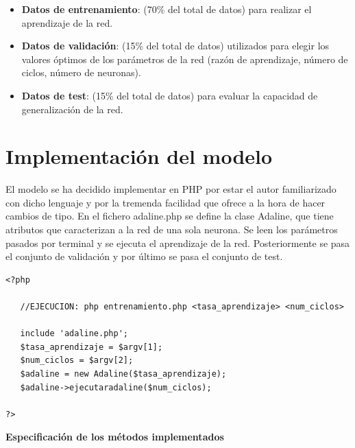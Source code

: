 \documentclass[11pt,spanish,listoffigures,listoftables]{workluis}
\begin{document}
\begin{itemize}
\item \textbf{Datos de entrenamiento}: (70\%  del  total  de  datos) para  realizar  el aprendizaje de la red. 
\item \textbf{Datos de validación}: (15\%  del  total  de  datos) utilizados para elegir los  valores  óptimos  de los parámetros  de  la  red  (razón  de aprendizaje, número de ciclos, número de neuronas).
\item \textbf{Datos de test}: (15\%  del  total  de  datos) para evaluar la capacidad de generalización de la red.
\end{itemize}

\section{Implementación del modelo}

\par El modelo se ha decidido implementar en PHP por estar el autor familiarizado con dicho lenguaje y por la tremenda facilidad que ofrece a la hora de hacer cambios de tipo. En el fichero adaline.php se define la clase Adaline, que tiene atributos que caracterizan a la red de una sola neurona. Se leen los parámetros pasados por terminal y se ejecuta el aprendizaje de la red. Posteriormente se pasa el conjunto de validación y por último se pasa el conjunto de test.

\begin{lstlisting}
<?php

   //EJECUCION: php entrenamiento.php <tasa_aprendizaje> <num_ciclos>

   include 'adaline.php';
   $tasa_aprendizaje = $argv[1];
   $num_ciclos = $argv[2];
   $adaline = new Adaline($tasa_aprendizaje);
   $adaline->ejecutaradaline($num_ciclos);

?>
\end{lstlisting}

\par \textbf{Especificación de los métodos implementados}
\end{document}
